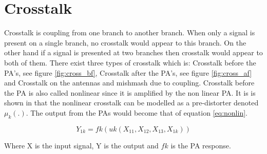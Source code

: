 \section{Crosstalk}
Crosstalk is coupling from one branch to another branch. When only a signal is present on a single branch, no crosstalk would appear to this branch. On the other hand if a signal is presented at two branches then crosstalk would appear to both of them. There exist three types of crosstalk which is: Crosstalk before the PA's, see figure \ref{fig:cross_bf}, Crosstalk after the PA's, see figure \ref{fig:cross_af} and Crosstalk on the antennas and mishmash due to coupling. Crosstalk before the PA is also called nonlinear since it is amplified by the non linear PA. It is is shown in \citep{islam2017} that the nonlinear crosstalk can be modelled as a pre-distorter denoted $\mu_k (.)$. The output from the PAs would become that of equation \ref{eq:nonlin}.

\begin{equation} \label{eq:nonlin}
Y_{1k} = fk(uk(X_{11},X_{12},X_{13},X_{1k}))
\end{equation}   

Where X is the input signal, Y is the output and $fk$ is the PA response. 

